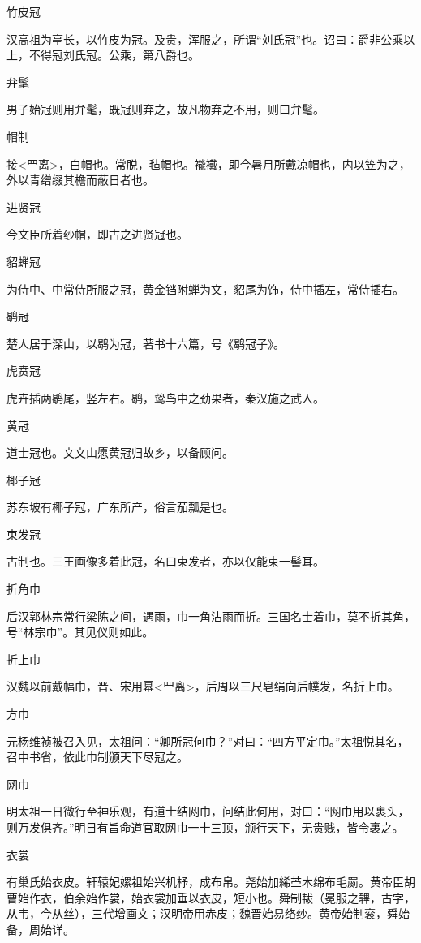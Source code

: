 \documentclass[a4paper,12pt,UTF8,twoside]{ctexbook}
\begin{document}
    竹皮冠
    
    汉高祖为亭长，以竹皮为冠。及贵，浑服之，所谓“刘氏冠”也。诏曰：爵非公乘以上，不得冠刘氏冠。公乘，第八爵也。
    
    弁髦
    
    男子始冠则用弁髦，既冠则弃之，故凡物弃之不用，则曰弁髦。
    
    帽制
    
    接<罒离>，白帽也。常脱，毡帽也。褦襶，即今暑月所戴凉帽也，内以笠为之，外以青缯缀其檐而蔽日者也。
    
    进贤冠
    
    今文臣所着纱帽，即古之进贤冠也。
    
    貂蝉冠
    
    为侍中、中常侍所服之冠，黄金铛附蝉为文，貂尾为饰，侍中插左，常侍插右。
    
    鹖冠
    
    楚人居于深山，以鹖为冠，著书十六篇，号《鹖冠子》。
    
    虎贲冠
    
    虎卉插两鹖尾，竖左右。鹖，鸷鸟中之劲果者，秦汉施之武人。
    
    黄冠
    
    道士冠也。文文山愿黄冠归故乡，以备顾问。
    
    椰子冠
    
    苏东坡有椰子冠，广东所产，俗言茄瓢是也。
    
    束发冠
    
    古制也。三王画像多着此冠，名曰束发者，亦以仅能束一髻耳。
    
    折角巾
    
    后汉郭林宗常行梁陈之间，遇雨，巾一角沾雨而折。三国名士着巾，莫不折其角，号“林宗巾”。其见仪则如此。
    
    折上巾
    
    汉魏以前戴幅巾，晋、宋用幂<罒离>，后周以三尺皂绢向后幞发，名折上巾。
    
    方巾
    
    元杨维祯被召入见，太祖问：“卿所冠何巾？”对曰：“四方平定巾。”太祖悦其名，召中书省，依此巾制颁天下尽冠之。
    
    网巾
    
    明太祖一日微行至神乐观，有道士结网巾，问结此何用，对曰：“网巾用以裹头，则万发俱齐。”明日有旨命道官取网巾一十三顶，颁行天下，无贵贱，皆令裹之。
    
    衣裳
    
    有巢氏始衣皮。轩辕妃嫘祖始兴机杼，成布帛。尧始加絺苎木绵布毛罽。黄帝臣胡曹始作衣，伯余始作裳，始衣裳加垂以衣皮，短小也。舜制韨（冕服之韠，古字，从韦，今从丝），三代增画文；汉明帝用赤皮；魏晋始易络纱。黄帝始制衮，舜始备，周始详。
    
\end{document}
